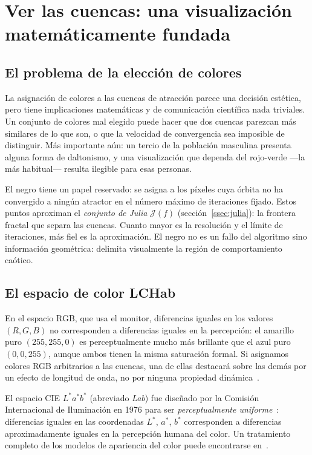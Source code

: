 \documentclass[11pt,a4paper]{article}
\theoremstyle{plain}
\theoremstyle{definition}
\theoremstyle{remark}
\begin{document}
\section{Ver las cuencas: una visualización matemáticamente fundada}
\label{sec:visualizacion}

\subsection{El problema de la elección de colores}

La asignación de colores a las cuencas de atracción parece una decisión
estética, pero tiene implicaciones matemáticas y de comunicación
científica nada triviales.
Un conjunto de colores mal elegido puede hacer que dos cuencas parezcan
más similares de lo que son, o que la velocidad de convergencia sea
imposible de distinguir.
Más importante aún: un tercio de la población masculina presenta alguna
forma de daltonismo, y una visualización que dependa del rojo-verde —la
más habitual— resulta ilegible para esas personas.

El negro tiene un papel reservado: se asigna a los píxeles cuya órbita
no ha convergido a ningún atractor en el número máximo de iteraciones
fijado.
Estos puntos aproximan el \emph{conjunto de Julia} $\mathcal{J}(f)$
(sección~\ref{ssec:julia}): la frontera fractal que separa las cuencas.
Cuanto mayor es la resolución y el límite de iteraciones, más fiel es la
aproximación.
El negro no es un fallo del algoritmo sino información geométrica:
delimita visualmente la región de comportamiento caótico.

\subsection{El espacio de color LCHab}

En el espacio RGB, que usa el monitor, diferencias iguales en los
valores $(R,G,B)$ no corresponden a diferencias iguales en la percepción:
el amarillo puro $(255,255,0)$ es perceptualmente mucho más brillante
que el azul puro $(0,0,255)$, aunque ambos tienen la misma saturación
formal.
Si asignamos colores RGB arbitrarios a las cuencas, una de ellas
destacará sobre las demás por un efecto de longitud de onda, no por
ninguna propiedad dinámica~\cite{Zeileis2009}.

El espacio CIE $L^*a^*b^*$ (abreviado \emph{Lab}) fue diseñado por la
Comisión Internacional de Iluminación en 1976 para ser
\emph{perceptualmente uniforme}~\cite{Schanda2007}: diferencias iguales
en las coordenadas $L^*$, $a^*$, $b^*$ corresponden a diferencias
aproximadamente iguales en la percepción humana del color.
Un tratamiento completo de los modelos de apariencia del color puede
encontrarse en~\cite{Fairchild2013}.
\end{document}

